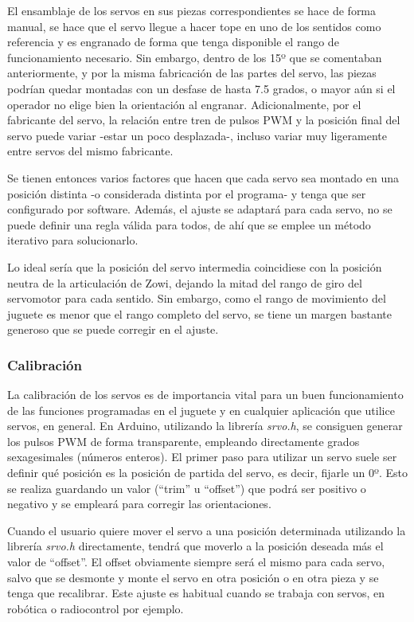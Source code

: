 El ensamblaje de los servos en sus piezas correspondientes se hace de forma manual, se hace que el servo llegue a hacer tope en uno de los sentidos como referencia y es engranado de forma que tenga disponible el rango de funcionamiento necesario. Sin embargo, dentro de los 15º que se comentaban anteriormente, y por la misma fabricación de las partes del servo, las piezas podrían quedar montadas con un desfase de hasta 7.5 grados, o mayor aún si el operador no elige bien la orientación al engranar. Adicionalmente, por el fabricante del servo, la relación entre tren de pulsos PWM y la posición final del servo puede variar -estar un poco desplazada-, incluso variar muy ligeramente entre servos del mismo fabricante.

Se tienen entonces varios factores que hacen que cada servo sea montado en una posición distinta -o considerada distinta por el programa- y tenga que ser configurado por software. Además, el ajuste se adaptará para cada servo, no se puede definir una regla válida para todos, de ahí que se emplee un método iterativo para solucionarlo.

Lo ideal sería que la posición del servo intermedia coincidiese con la posición neutra de la articulación de Zowi, dejando la mitad del rango de giro del servomotor para cada sentido. Sin embargo, como el rango de movimiento del juguete es menor que el rango completo del servo, se tiene un margen bastante generoso que se puede corregir en el ajuste.

\subsubsection{Calibración}
La calibración de los servos es de importancia vital para un buen funcionamiento de las funciones programadas en el juguete y en cualquier aplicación que utilice servos, en general. En Arduino, utilizando la librería \textit{srvo.h}, se consiguen generar los pulsos PWM de forma transparente, empleando directamente grados sexagesimales (números enteros). El primer paso para utilizar un servo suele ser definir qué posición es la posición de partida del servo, es decir, fijarle un 0º. Esto se realiza guardando un valor (``trim'' u ``offset'') que podrá ser positivo o negativo y se empleará para corregir las orientaciones.

Cuando el usuario quiere mover el servo a una posición determinada utilizando la librería \textit{srvo.h} directamente, tendrá que moverlo a la posición deseada más el valor de ``offset''. El offset obviamente siempre será el mismo para cada servo, salvo que se desmonte y monte el servo en otra posición o en otra pieza y se tenga que recalibrar. Este ajuste es habitual cuando se trabaja con servos, en robótica o radiocontrol por ejemplo.

